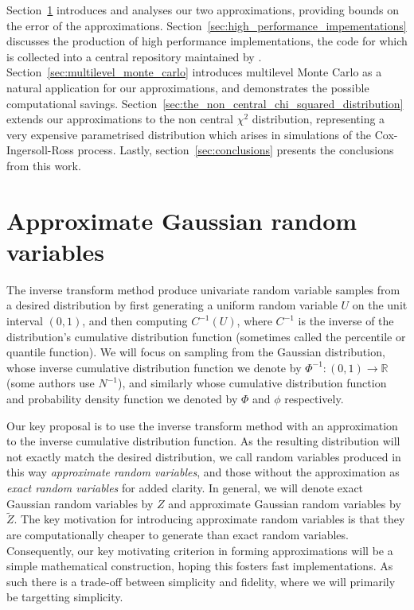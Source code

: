 \documentclass[9pt,a4paper,english]{extarticle}
\begin{document}
Section~\ref{sec:approximate_gaussian_random_variables} introduces and analyses our two approximations, providing bounds on the error of the approximations. Section~\ref{sec:high_performance_impementations} discusses the production of high performance implementations, the code for which is collected into a central repository maintained by \citet{sheridan2020approximate_random,sheridan2020approximate_inverse}. Section~\ref{sec:multilevel_monte_carlo} introduces multilevel Monte Carlo as a natural application for our approximations, and demonstrates the possible computational savings. Section~\ref{sec:the_non_central_chi_squared_distribution} extends our approximations to the non central $ \chi^2 $ distribution, representing a very expensive parametrised distribution which arises in simulations of the Cox-Ingersoll-Ross process. Lastly, section~\ref{sec:conclusions} presents the conclusions from this work. 

\section{Approximate Gaussian random variables}
\label{sec:approximate_gaussian_random_variables}

The inverse transform method \citep[2.2.1]{glasserman2013monte} produce univariate random variable samples from a desired distribution by first generating a uniform random variable $U$ on the unit interval $(0,1)$, and then computing $C^{-1}(U)$, where $C^{-1}$ is the inverse of the distribution's cumulative distribution function (sometimes called the percentile or quantile function). We will focus on sampling from the Gaussian distribution, whose inverse cumulative distribution function we denote by $ \Phi^{-1} \colon (0, 1) \to \mathbb{R} $ (some authors use $ N^{-1} $), and similarly whose cumulative distribution function and probability density function we denoted by $ \Phi $ and $ \phi $ respectively. 

Our key proposal is to use the inverse transform method with an approximation to the inverse cumulative distribution function. As the resulting distribution will not exactly match the desired distribution, we call random variables produced in this way \emph{approximate random variables}, and those without the approximation as \emph{exact random variables} for added clarity. In general, we will denote exact Gaussian random variables by $ Z $ and approximate Gaussian random variables by $ \widetilde{Z} $. The key motivation for introducing approximate random variables is that they are computationally cheaper to generate than exact random variables. Consequently, our key motivating criterion in forming approximations will be a simple mathematical construction, hoping this fosters fast implementations. As such there is a trade-off between simplicity and fidelity, where we will primarily be targetting simplicity. 
\end{document}
